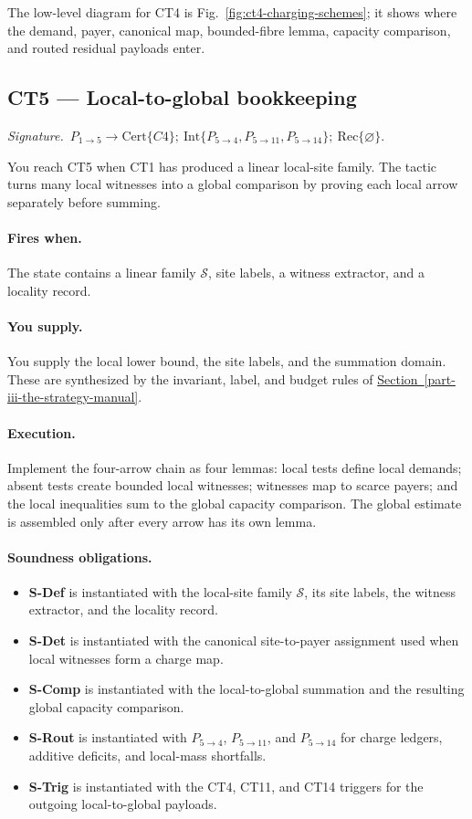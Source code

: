 \documentclass[
  11pt,
]{article}
\providecommand{\tightlist}{%
  \setlength{\itemsep}{0pt}\setlength{\parskip}{0pt}}
\theoremstyle{definition}
\newcommand{\secref}[1]{\hyperref[#1]{Section~\ref*{#1}}}
\newcommand{\ctsignature}[1]{\par\noindent\emph{Signature.}\ #1\par\medskip}
\newcommand{\ctcert}[1]{\mathrm{Cert}\{#1\}}
\newcommand{\ctint}[1]{\mathrm{Int}\{#1\}}
\newcommand{\ctrec}[1]{\mathrm{Rec}\{#1\}}
\newcommand{\ctnone}{\varnothing}
\newcommand{\ctpar}[1]{\paragraph{#1.}}
\begin{document}
The low-level diagram for CT4 is Fig.~\ref{fig:ct4-charging-schemes};
it shows where the demand, payer, canonical map, bounded-fibre lemma,
capacity comparison, and routed residual payloads enter.


\subsection{CT5 --- Local-to-global bookkeeping}\label{ct:5}\label{the-local-versus-global-rationale}
\ctsignature{\(P_{1\to5}\to \ctcert{C4};\ \ctint{P_{5\to4},P_{5\to11},P_{5\to14}};\ \ctrec{\ctnone}\).}

You reach CT5 when CT1 has produced a linear local-site family.  The
tactic turns many local witnesses into a global comparison by proving
each local arrow separately before summing.

\ctpar{Fires when}
The state contains a linear family \(\mathcal S\), site labels, a witness
extractor, and a locality record.

\ctpar{You supply}
You supply the local lower bound, the site labels, and the summation
domain.  These are synthesized by the invariant, label, and budget rules
of \secref{part-iii-the-strategy-manual}.

\ctpar{Execution}
Implement the four-arrow chain as four lemmas: local tests define local
demands; absent tests create bounded local witnesses; witnesses map to
scarce payers; and the local inequalities sum to the global capacity
comparison.  The global estimate is assembled only after every arrow has
its own lemma.

\ctpar{Soundness obligations}
\begin{itemize}
\tightlist
\item \textbf{S-Def} is instantiated with the local-site family \(\mathcal S\), its site labels, the witness extractor, and the locality record.
\item \textbf{S-Det} is instantiated with the canonical site-to-payer assignment used when local witnesses form a charge map.
\item \textbf{S-Comp} is instantiated with the local-to-global summation and the resulting global capacity comparison.
\item \textbf{S-Rout} is instantiated with \(P_{5\to4}\), \(P_{5\to11}\), and \(P_{5\to14}\) for charge ledgers, additive deficits, and local-mass shortfalls.
\item \textbf{S-Trig} is instantiated with the CT4, CT11, and CT14 triggers for the outgoing local-to-global payloads.
\end{itemize}
\end{document}
